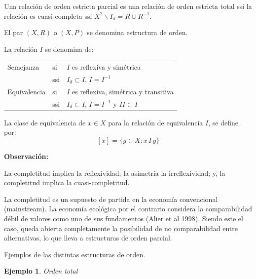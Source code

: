 \documentclass[a5paper,doc,10pt,noapacite]{apa6}
\newtheorem{ejem}{Ejemplo}
\begin{document}
{{\vspace{-1\baselineskip}

Una relación de orden estricta parcial es una relación de orden estricta total ssi la relación es cuasi-completa ssi \(X^2  \backslash  I_d = R \cup R^{-1}\).

El par \((X,R)\) o \((X,P)\) se denomina estructura de orden.

La relación \(I\) se denomina de:

\begin{table}[H]
\fontsize{7.5}{11}\selectfont
\begin{center}
	\begin{tabular}{l l l }
		Semejanza & si & \(I\) es reflexiva y simétrica \\
	    	      & ssi & \(I_d \subset I \), \(I = I^{-1} \)\\
		Equivalencia & si & \(I\) es reflexiva, simétrica y transitiva \\
	          	     & ssi & \(I_d \subset I \), \(I = I^{-1} \) y \(II \subset I\)\\[-1\baselineskip]
	\end{tabular}
\label{tab:B10} 
\end{center}
\end{table}

\vspace{-1\baselineskip}

La clase de equivalencia de \(x \in X\) para la relación de equivalencia \(I\), se define por:
\[
	[x] = \big\{y \in X : x \, I \, y \big\}
\]

\textbf{Observación:}

\begin{APAenumerate}
    \item La completitud implica la reflexividad; la asimetría la irreflexividad; y, la completitud implica la cuasi-completitud.
    \item La completitud es un supuesto de partida en la economía convencional (mainstream). La economía ecológica por el contrario considera la comparabilidad débil de valores como uno de sus fundamentos (Alier et al 1998). Siendo este el caso, queda abierta completamente la posibilidad de no comparabilidad entre alternativas, lo que lleva a estructuras de orden parcial.
\end{APAenumerate}



Ejemplos de las distintas estructuras de orden.


\begin{ejem} Orden total


\end{ejem}}}
\end{document}
